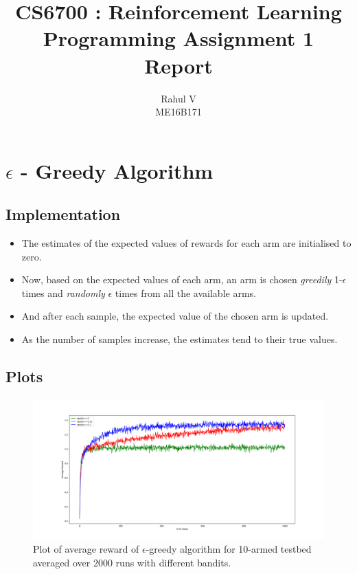 \documentclass[english]{article}
\title{\textbf{CS6700 : Reinforcement Learning } \\ Programming Assignment 1 \\ Report}
\author{Rahul V \\ ME16B171}
\begin{document}
\maketitle

\tableofcontents
\pagebreak
\section{$\epsilon$ - Greedy Algorithm}
\subsection{Implementation}
\begin{itemize}
    \item The estimates of the expected values of rewards for each arm are initialised to zero.
    \item Now, based on the expected values of each arm, an arm is chosen \emph{greedily} 1-$\epsilon$ times and \emph{randomly} $\epsilon$ times from all the available arms.
    \item And after each sample, the expected value of the chosen arm is updated.
    \item As the number of samples increase, the estimates tend to their true values.
\end{itemize}
\subsection{Plots}
\begin{figure}[H]
    \centering
    \includegraphics[width=\linewidth]{e_greedy_avg_reward_10arms.png}
    \caption{Plot of average reward of $\epsilon$-greedy algorithm for 10-armed testbed averaged over 2000 runs with different bandits.}
    \label{fig:eg1}
\end{figure}
\end{document}
